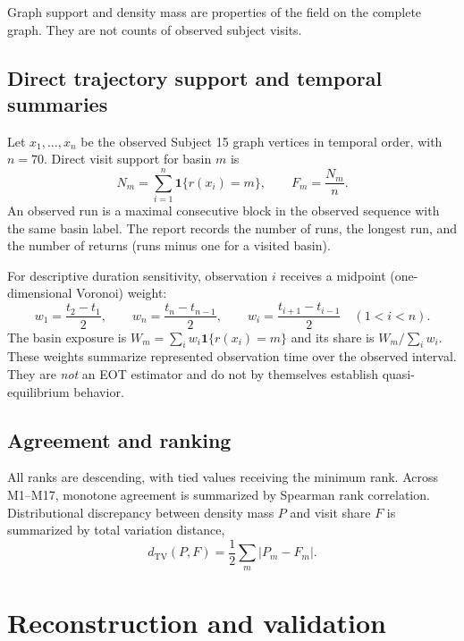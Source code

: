 \documentclass[11pt]{article}
\begin{document}
Graph support and density mass are properties of the field on the complete
graph.  They are not counts of observed subject visits.

\subsection{Direct trajectory support and temporal summaries}

Let $x_1,\ldots,x_n$ be the observed Subject 15 graph vertices in temporal
order, with $n=70$.  Direct visit support for basin $m$ is
\[
 N_m=\sum_{i=1}^{n}\mathbf{1}\{r(x_i)=m\},
 \qquad
 F_m=\frac{N_m}{n}.
\]
An observed run is a maximal consecutive block in the observed sequence with
the same basin label.  The report records the number of runs, the longest run,
and the number of returns (runs minus one for a visited basin).

For descriptive duration sensitivity, observation $i$ receives a midpoint
(one-dimensional Voronoi) weight:
\[
 w_1=\frac{t_2-t_1}{2},\qquad
 w_n=\frac{t_n-t_{n-1}}{2},\qquad
 w_i=\frac{t_{i+1}-t_{i-1}}{2}\quad(1<i<n).
\]
The basin exposure is $W_m=\sum_i w_i\mathbf{1}\{r(x_i)=m\}$ and its share is
$W_m/\sum_iw_i$.  These weights summarize represented observation time over
the observed interval.  They are \emph{not} an EOT estimator and do not by
themselves establish quasi-equilibrium behavior.

\subsection{Agreement and ranking}

All ranks are descending, with tied values receiving the minimum rank.  Across
M1--M17, monotone agreement is summarized by Spearman rank correlation.
Distributional discrepancy between density mass $P$ and visit share $F$ is
summarized by total variation distance,
\[
 d_{\mathrm{TV}}(P,F)=\frac{1}{2}\sum_m|P_m-F_m|.
\]

\section{Reconstruction and validation}
\end{document}
